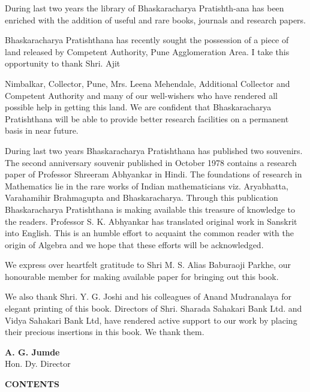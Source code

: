 \documentclass[]{article}
\begin{document}
During last two years the library of Bhaskaracharya Pratishth-ana has been enriched with the addition of useful and rare books, journals and research papers.

Bhaskaracharya Pratishthana has recently sought the possession of a
piece of land released by Competent Authority, Pune Agglomeration Area. I take this opportunity to thank Shri. Ajit 
\afterpage{\fancyhead[CE,CO]{\ldots \thepage \ldots}}
\cfoot{}
\newpage
\setcounter{page}{5}

\noindent Nimbalkar, Collector, Pune, Mrs. Leena Mehendale, Additional Collector
and Competent Authority and many of our well-wishers who have rendered
all possible help in getting this land. We are confident that
Bhaskaracharya Pratishthana will be able to provide better research
facilities on a permanent basis in near future.

During last two years Bhaskaracharya Pratishthana has published two
souvenirs. The second anniversary souvenir published in October 1978
contains a research paper of Professor Shreeram Abhyankar in Hindi. The
foundations of research in Mathematics lie in the rare works of Indian
mathematicians viz. Aryabhatta, Varahamihir Brahmagupta and
Bhaskaracharya. Through this publication Bhaskaracharya Pratishthana is
making available this treasure of knowledge to the readers. Professor S.
K. Abhyankar has translated original work in Sanskrit into English. This
is an humble effort to acquaint the common reader with the origin of
Algebra and we hope that these efforts will be acknowledged.

We express over heartfelt gratitude to Shri M. S. Alias Baburaoji
Parkhe, our honourable member for making available paper for bringing
out this book.

We also thank Shri. Y. G. Joshi and his colleagues of Anand Mudranalaya
for elegant printing of this book. Directors of Shri. Sharada Sahakari
Bank Ltd. and Vidya Sahakari Bank Ltd, have rendered active support to
our work by placing their precious insertions in this book. We thank
them. 
\vspace{10pt}
\begin{center}
	\begin{flushright}
		\textbf{A. G. Jumde\;\;\;}\\
		Hon. Dy. Director\\
		
	\end{flushright}
\end{center}
\newpage
\thispagestyle{empty}
\large
\begin{center}
    \textbf{CONTENTS}\\
\end{center}
\end{document}
